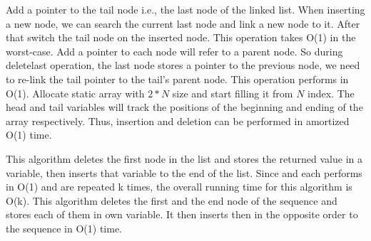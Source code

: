 \documentclass[12pt,twoside]{article}
\begin{document}
\begin{problems}
\newpage
\problem  %
\begin{problemparts}
\problempart %
Add a pointer to the tail node i.e., the last node of the linked list. When inserting a new node, we can search the current last node and link a new node to it. After that switch the tail node on the inserted node. This operation takes O(1) in the worst-case.
\problempart %
Add a pointer to each node will refer to a parent node. So during delete\textunderscore last operation, the last node stores a pointer to the previous node, we need to re-link the tail pointer to the tail's parent node. This operation performs in O(1).
\problempart %
Allocate static array with $2 * N$ size and start filling it from $N$ index. The head and tail variables will track the positions of the beginning and ending of the array respectively. Thus, insertion and deletion can be performed in amortized O(1) time.
\end{problemparts}

\problem  %

\begin{problemparts}
\problempart %
This algorithm deletes the first node in the list and stores the returned value in a variable, then inserts that variable to the end of the list. Since  and  each performs in O(1) and are repeated k times, the overall running time for this algorithm is O(k).
\problempart %
This algorithm deletes the first and the end node of the sequence and stores each of them in own variable. It then inserts then in the opposite order to the sequence in O(1) time. 
\end{problemparts}
\newpage
\problem  %


\end{problems}
\end{document}
